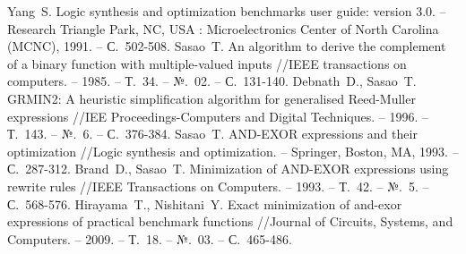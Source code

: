 \documentclass[a4paper,12pt,titlepage,finall]{article}
\begin{document}
\begin{raggedright}
\begin{thebibliography}{99}
     Yang~S. Logic synthesis and optimization benchmarks user guide: version 3.0. – Research Triangle Park, NC, USA : Microelectronics Center of North Carolina (MCNC), 1991. – С.~502-508.
     Sasao~T. An algorithm to derive the complement of a binary function with multiple-valued inputs //IEEE transactions on computers. – 1985. – Т.~34. – №.~02. – С.~131-140.
     Debnath~D., Sasao~T. GRMIN2: A heuristic simplification algorithm for generalised Reed-Muller expressions //IEE Proceedings-Computers and Digital Techniques. – 1996. – Т.~143. – №.~6. – С.~376-384.
     Sasao~T. AND-EXOR expressions and their optimization //Logic synthesis and optimization. – Springer, Boston, MA, 1993. – С.~287-312.
     Brand~D., Sasao~T. Minimization of AND-EXOR expressions using rewrite rules //IEEE Transactions on Computers. – 1993. – Т.~42. – №.~5. – С.~568-576.
     Hirayama~T., Nishitani~Y. Exact minimization of and-exor expressions of practical benchmark functions //Journal of Circuits, Systems, and Computers. – 2009. – Т.~18. – №.~03. – С.~465-486.
\end{thebibliography}
\end{raggedright}
\end{document}
